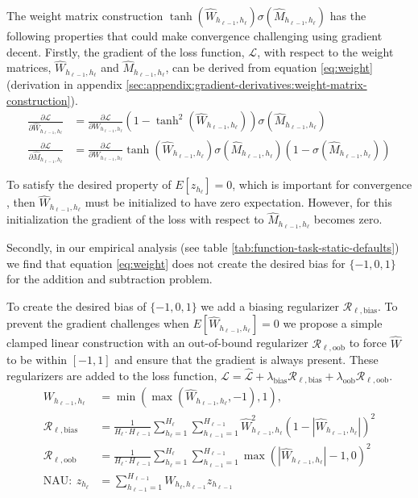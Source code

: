 The weight matrix construction $\tanh(\hat{W}_{h_{\ell-1},h_\ell}) \sigma(\hat{M}_{h_{\ell-1},h_\ell})$ has the following properties that could make convergence challenging using gradient decent. Firstly, the gradient of the loss function, $\mathcal{L}$, with respect to the weight matrices, $\hat{W}_{h_{\ell-1},h_\ell}$ and $\hat{M}_{h_{\ell-1},h_\ell}$, can be derived from equation \ref{eq:weight} (derivation in appendix \ref{sec:appendix:gradient-derivatives:weight-matrix-construction}).
\begin{equation}
\begin{aligned}
\frac{\partial \mathcal{L}}{\partial \hat{W}_{h_{\ell-1},h_\ell}} &= \frac{\partial \mathcal{L}}{\partial W_{h_{\ell-1},h_\ell}} (1 - \tanh^2(\hat{W}_{h_{\ell-1},h_\ell})) \sigma(\hat{M}_{h_{\ell-1},h_\ell}) \\
\frac{\partial \mathcal{L}}{\partial \hat{M}_{h_{\ell-1},h_\ell}} &= \frac{\partial \mathcal{L}}{\partial W_{h_{\ell-1},h_\ell}} \tanh(\hat{W}_{h_{\ell-1},h_\ell}) \sigma(\hat{M}_{h_{\ell-1},h_\ell}) (1 - \sigma(\hat{M}_{h_{\ell-1},h_\ell}))
\end{aligned}
\label{eq:nac-weight-gradient}
\end{equation}

To satisfy the desired property of $E[z_{h_\ell}]  = 0$, which is important for convergence \cite{glorot-initialization}, then  $\hat{W}_{h_{\ell-1},h_\ell}$ must be initialized to have zero expectation.
However, for this initialization the gradient of the loss with respect to  $\hat{M}_{h_{\ell-1},h_\ell}$ becomes zero.

Secondly, in our empirical analysis (see table \ref{tab:function-task-static-defaults}) we find that equation \ref{eq:weight} does not create the desired bias for $\{-1, 0, 1\}$ for the addition and subtraction problem.

To create the desired bias of $\{-1, 0, 1\}$ we add a biasing regularizer $\mathcal{R}_{\ell,\mathrm{bias}}$. To prevent the gradient challenges when $E[\hat{W}_{h_{\ell-1},h_\ell}] = 0$ we propose a simple clamped linear construction with an out-of-bound regularizer $\mathcal{R}_{\ell,\mathrm{oob}}$ to force $\hat{W}$ to be within $[-1, 1]$ and ensure that the gradient is always present. These regularizers are added to the loss function, $\mathcal{L} = \hat{\mathcal{L}} + \lambda_{\mathrm{bias}} \mathcal{R}_{\ell,\mathrm{bias}} + \lambda_{\mathrm{oob}} \mathcal{R}_{\ell,\mathrm{oob}}$.
\begin{align}
W_{h_{\ell-1},h_\ell} &= \min(\max(\hat{W}_{h_{\ell-1},h_\ell}, -1), 1), \\
\mathcal{R}_{\ell,\mathrm{bias}} &= \frac{1}{H_\ell \cdot H_{\ell-1}} \sum_{h_\ell=1}^{H_\ell} \sum_{h_{\ell-1}=1}^{H_{\ell-1}} \hat{W}_{h_{\ell-1},h_\ell}^2 (1 - |\hat{W}_{h_{\ell-1},h_\ell}|)^2 \\
\mathcal{R}_{\ell,\mathrm{oob}} &= \frac{1}{H_\ell \cdot H_{\ell-1}} \sum_{h_\ell=1}^{H_\ell} \sum_{h_{\ell-1}=1}^{H_{\ell-1}} \max(|\hat{W}_{h_{\ell-1},h_\ell}| - 1, 0)^2 \\
\textrm{NAU}:\ z_{h_\ell} &= \sum_{h_{\ell-1}=1}^{H_{\ell-1}} W_{h_{\ell}, h_{\ell-1}} z_{h_{\ell-1}}
\end{align}

